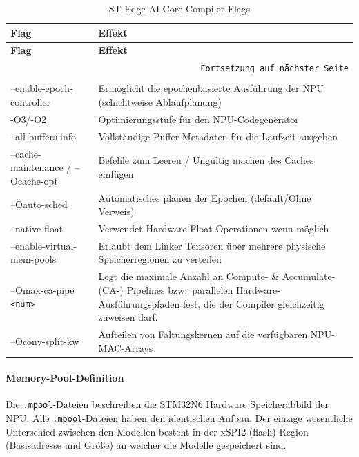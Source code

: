 \begin{longtable}{|p{}|p{}|}
    \hline
    \textbf{Flag} & \textbf{Effekt} \\
    \hline
    \endfirsthead
    \hline
    \textbf{Flag} & \textbf{Effekt} \\
    \hline
    \endhead
    \hline
    \multicolumn{2}{r}{\texttt{Fortsetzung auf nächster Seite}} \\
    \endfoot
    \caption{ST Edge AI Core Compiler Flags}
    \label{tab:stedgeai-flags} \\
    \endlastfoot
    --enable-epoch-controller & Ermöglicht die epochenbasierte Ausführung der NPU (schichtweise Ablaufplanung) \\
    \hline
    -O3/-O2 & Optimierungsstufe für den NPU-Codegenerator \\
    \hline
    --all-buffers-info & Vollständige Puffer-Metadaten für die Laufzeit ausgeben \\
    \hline
    --cache-maintenance / --Ocache-opt & Befehle zum Leeren / Ungültig machen des Caches einfügen \\
    \hline
    --Oauto-sched & Automatisches planen der Epochen (default/Ohne Verweis) \\
    \hline
    --native-float & Verwendet Hardware-Float-Operationen wenn möglich \\
    \hline
    --enable-virtual-mem-pools & Erlaubt dem Linker Tensoren über mehrere physische Speicherregionen zu verteilen \\
    \hline
    --Omax-ca-pipe \texttt{<num>} & Legt die maximale Anzahl an Compute- \& Accumulate-(CA-) Pipelines bzw.\ parallelen Hardware-Ausführungspfaden fest, die der Compiler gleichzeitig zuweisen darf. \\
    \hline
    --Oconv-split-kw & Aufteilen von Faltungskernen auf die verfügbaren NPU-MAC-Arrays \\
    \hline
\end{longtable}

\paragraph{Memory-Pool-Definition}
Die \texttt{.mpool}-Dateien beschreiben die STM32N6 Hardware Speicherabbild der NPU. Alle \texttt{.mpool}-Dateien haben den identischen Aufbau. Der einzige wesentliche Unterschied zwischen den Modellen besteht in der xSPI2 (flash) Region (Basisadresse und Größe) an welcher die Modelle gespeichert sind.

